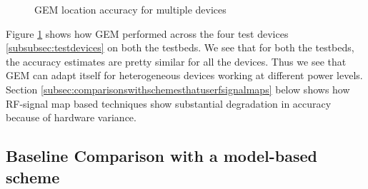 \begin{figure}
	\centering
	\caption{GEM location accuracy for multiple devices}
	\label{fig:gemheterogeneousdevices}
\end{figure}

Figure \ref{fig:gemheterogeneousdevices} shows how GEM performed across the four test devices \ref{subsubsec:testdevices} on both the testbeds. We see that for both the testbeds, the accuracy estimates are pretty similar for all the devices. Thus we see that GEM can adapt itself for heterogeneous devices working at different power levels. Section \ref{subsec:comparisonswithschemesthatuserfsignalmaps} below shows how RF-signal map based techniques show substantial degradation in accuracy because of hardware variance. 

\subsection{Baseline Comparison with a model-based scheme}
\label{subsec:baselinecomparisonwithamodelbasedscheme}

